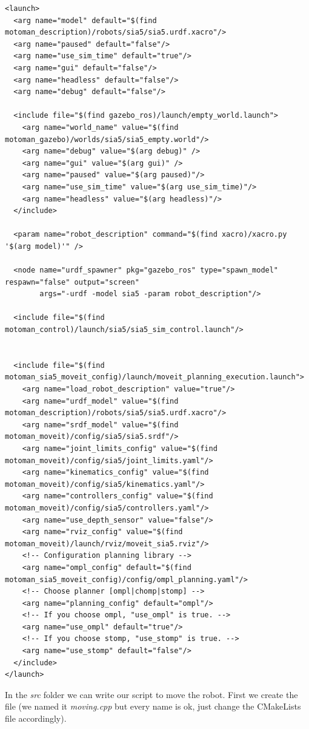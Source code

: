 \begin{lstlisting}
<launch>
  <arg name="model" default="$(find motoman_description)/robots/sia5/sia5.urdf.xacro"/>
  <arg name="paused" default="false"/>
  <arg name="use_sim_time" default="true"/>
  <arg name="gui" default="false"/>
  <arg name="headless" default="false"/>
  <arg name="debug" default="false"/>

  <include file="$(find gazebo_ros)/launch/empty_world.launch">
    <arg name="world_name" value="$(find motoman_gazebo)/worlds/sia5/sia5_empty.world"/>
    <arg name="debug" value="$(arg debug)" />
    <arg name="gui" value="$(arg gui)" />
    <arg name="paused" value="$(arg paused)"/>
    <arg name="use_sim_time" value="$(arg use_sim_time)"/>
    <arg name="headless" value="$(arg headless)"/>
  </include>

  <param name="robot_description" command="$(find xacro)/xacro.py '$(arg model)'" />
  
  <node name="urdf_spawner" pkg="gazebo_ros" type="spawn_model" respawn="false" output="screen"
  		args="-urdf -model sia5 -param robot_description"/>

  <include file="$(find motoman_control)/launch/sia5/sia5_sim_control.launch"/>


  <include file="$(find motoman_sia5_moveit_config)/launch/moveit_planning_execution.launch">
    <arg name="load_robot_description" value="true"/>
    <arg name="urdf_model" value="$(find motoman_description)/robots/sia5/sia5.urdf.xacro"/>
    <arg name="srdf_model" value="$(find motoman_moveit)/config/sia5/sia5.srdf"/>
    <arg name="joint_limits_config" value="$(find motoman_moveit)/config/sia5/joint_limits.yaml"/>
    <arg name="kinematics_config" value="$(find motoman_moveit)/config/sia5/kinematics.yaml"/>
    <arg name="controllers_config" value="$(find motoman_moveit)/config/sia5/controllers.yaml"/>
    <arg name="use_depth_sensor" value="false"/>
    <arg name="rviz_config" value="$(find motoman_moveit)/launch/rviz/moveit_sia5.rviz"/>
    <!-- Configuration planning library -->
    <arg name="ompl_config" default="$(find motoman_sia5_moveit_config)/config/ompl_planning.yaml"/>
    <!-- Choose planner [ompl|chomp|stomp] -->
    <arg name="planning_config" default="ompl"/>
    <!-- If you choose ompl, "use_ompl" is true. -->
    <arg name="use_ompl" default="true"/>
    <!-- If you choose stomp, "use_stomp" is true. -->
    <arg name="use_stomp" default="false"/>
  </include>
</launch>
\end{lstlisting}

In the \emph{src} folder we can write our script to move the robot. First we create the file (we named it \emph{moving.cpp} but every name is ok, just change the CMakeLists file accordingly). 

